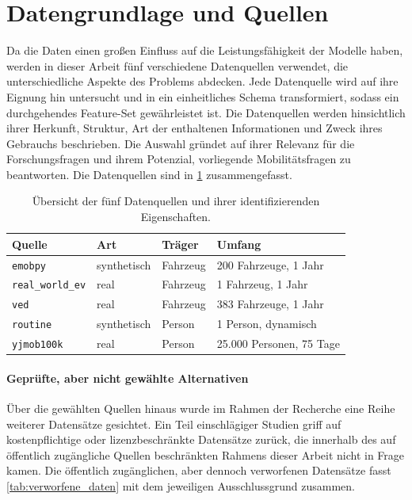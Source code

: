 \section{Datengrundlage und Quellen}
\label{sec:datengrundlage}

Da die Daten einen großen Einfluss auf die Leistungsfähigkeit der Modelle haben, werden in dieser Arbeit fünf verschiedene Datenquellen verwendet, die unterschiedliche Aspekte des Problems abdecken. Jede Datenquelle wird auf ihre Eignung hin untersucht und in ein einheitliches Schema transformiert, sodass ein durchgehendes Feature-Set gewährleistet ist. Die Datenquellen werden hinsichtlich ihrer Herkunft, Struktur, Art der enthaltenen Informationen und Zweck ihres Gebrauchs beschrieben. Die Auswahl gründet auf ihrer Relevanz für die Forschungsfragen und ihrem Potenzial, vorliegende Mobilitätsfragen zu beantworten. Die Datenquellen sind in \cref{tab:datengrundlage} zusammengefasst.

\begin{table}[htbp]
  \centering
  \caption{Übersicht der fünf Datenquellen und ihrer identifizierenden Eigenschaften.}
  \label{tab:datengrundlage}
  \begin{tabular}{@{}l l l l@{}}
    \toprule
    \textbf{Quelle} & \textbf{Art} & \textbf{Träger} & \textbf{Umfang} \\
    \midrule
    \texttt{emobpy} & synthetisch & Fahrzeug & 200 Fahrzeuge, 1 Jahr \\
    \addlinespace
    \texttt{real\_world\_ev} & real & Fahrzeug & 1 Fahrzeug, 1 Jahr \\
    \addlinespace
    \texttt{ved} & real & Fahrzeug & 383 Fahrzeuge, 1 Jahr \\
    \addlinespace
    \texttt{routine} & synthetisch & Person & 1 Person, dynamisch \\
    \addlinespace
    \texttt{yjmob100k} & real & Person & 25.000 Personen, 75 Tage \\
    \bottomrule
  \end{tabular}
\end{table}

\paragraph{Geprüfte, aber nicht gewählte Alternativen}
Über die gewählten Quellen hinaus wurde im Rahmen der Recherche eine Reihe weiterer Datensätze gesichtet. Ein Teil einschlägiger Studien griff auf kostenpflichtige oder lizenzbeschränkte Datensätze zurück, die innerhalb des auf öffentlich zugängliche Quellen beschränkten Rahmens dieser Arbeit nicht in Frage kamen. Die öffentlich zugänglichen, aber dennoch verworfenen Datensätze fasst \cref{tab:verworfene_daten} mit dem jeweiligen Ausschlussgrund zusammen.

